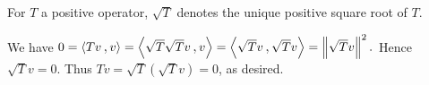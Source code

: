 \begin{mydef}
  For $T$ a positive operator, $\sqrt{T}$ denotes the unique positive square root of $T$.
\end{mydef}

\begin{prf}
  We have $0 = \ip{Tv}{v}= \ip{\sqrt{T}\sqrt{T}v}{v} = \ip{\sqrt{T}v}{\sqrt{T}v} = \norm{\sqrt{T}v}^2.$ Hence $\sqrt{T}v = 0$. Thus $Tv = \sqrt{T}\left(\sqrt{T}v\right)=0$, as desired.
\end{prf}